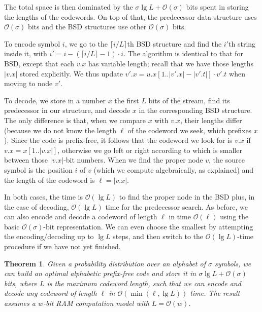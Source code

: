\documentclass[preprint,12pt]{elsarticle}
\newcommand{\Oh}[1]{\ensuremath{\mathcal{O}\!\left({#1}\right)}}
\renewcommand{\log}{\lg}
\newtheorem{theorem}{Theorem}
\begin{document}
The total space is then dominated by the $\sigma\log L + \Oh{\sigma}$ bits 
spent in
storing the lengths of the codewords. On top of that, the predecessor data 
structure uses $\Oh{\sigma}$ bits and the BSD structures use other $\Oh{\sigma}$
bits.

To encode symbol $i$, we go to the $\lceil i/L\rceil$th BSD structure and
find the $i'$th string inside it, with $i'=i-(\lceil i/L\rceil-1)\cdot i$.
The algorithm is identical to that for BSD, except that each $v.x$ has 
variable length; recall that we have those lengths $|v.x|$ stored explicitly. 
We thus update $v'.x = u.x[1..|v'.x|-|v'.t|] \cdot v'.t$ when moving to node
$v'$.

To decode, we store in a number $x$ the first $L$ bits of the stream, find its 
predecessor in our structure, and decode $x$ in the corresponding BSD structure.
The only difference is that, when we compare $x$ with $v.x$, their lengths
differ (because we do not know the length $\ell$ of the codeword we seek, which
prefixes $x$). Since the code is prefix-free, it follows that the codeword we
look for is $v.x$ if $v.x = x[1..|v.x|]$, otherwise we go left or right
according to which is smaller between those $|v.x|$-bit numbers. When we find
the proper node $v$, the source symbol is the position $i$ of $v$ (which we
compute algebraically, as explained) and the length of the codeword is 
$\ell = |v.x|$.

In both cases, the time is $\Oh{\log L}$ to find the proper node in the BSD
plus, in the case of decoding, $\Oh{\log L}$ time for the predecessor search.
As before, we can also encode and decode a codeword of length $\ell$ in time 
$\Oh{\ell}$ using the basic $\Oh{\sigma}$-bit representation. We can even choose
the smallest by attempting the encoding/decoding up to $\log L$ steps, and then
switch to the $\Oh{\log L}$-time procedure if we have not yet finished.

\begin{theorem}
\label{thm:optimal}
Given a probability distribution over an alphabet of $\sigma$ symbols, we 
can build an optimal alphabetic prefix-free code and store it in 
$\sigma \log L + \Oh{\sigma}$ bits, where $L$ is the maximum codeword length, 
such that we can encode and decode any codeword of length $\ell$ in 
$\Oh{\min (\ell, \log L)}$ time.
The result assumes a $w$-bit RAM computation model with $L=\Oh{w}$.
\end{theorem}
\end{document}
